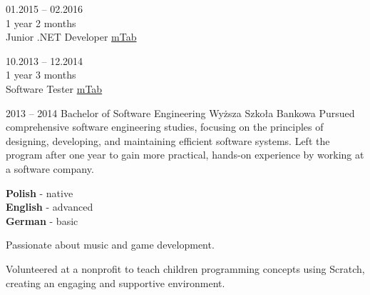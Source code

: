 \documentclass[9pt]{config}
\begin{document}
\begin{entrylist}
  \entry
  {01.2015 -- 02.2016\\\footnotesize 1 year 2 months\\}
  {Junior .NET Developer}
  {\href{https://mtab.com}{mTab}}
  {}
  {}

  \entry
  {10.2013 -- 12.2014\\\footnotesize 1 year 3 months\\}
  {Software Tester}
  {\href{https://mtab.com}{mTab}}
  {}
  {}
\end{entrylist}



\begin{entrylist}
  \entry
  {2013 -- 2014}
  {Bachelor of Software Engineering}
  {Wyższa Szkoła Bankowa}
  {Pursued comprehensive software engineering studies, focusing on
    the principles of designing, developing, and maintaining efficient
    software systems. Left the program after one year to gain more
  practical, hands-on experience by working at a software company.}
  {}
\end{entrylist}


\begin{minipage}[t]{0.3\textwidth}
  \vspace{-\baselineskip}


  \textbf{Polish} - native\\
  \textbf{English} - advanced\\
  \textbf{German} - basic\\
\end{minipage}
\hfill
\begin{minipage}[t]{0.3\textwidth}
  \vspace{-\baselineskip}


  Passionate about music and game development.
\end{minipage}
\hfill
\begin{minipage}[t]{0.3\textwidth}
  \vspace{-\baselineskip}


  Volunteered at a nonprofit to teach children programming concepts
  using Scratch, creating an engaging and supportive environment.
\end{minipage}

\end{document}
